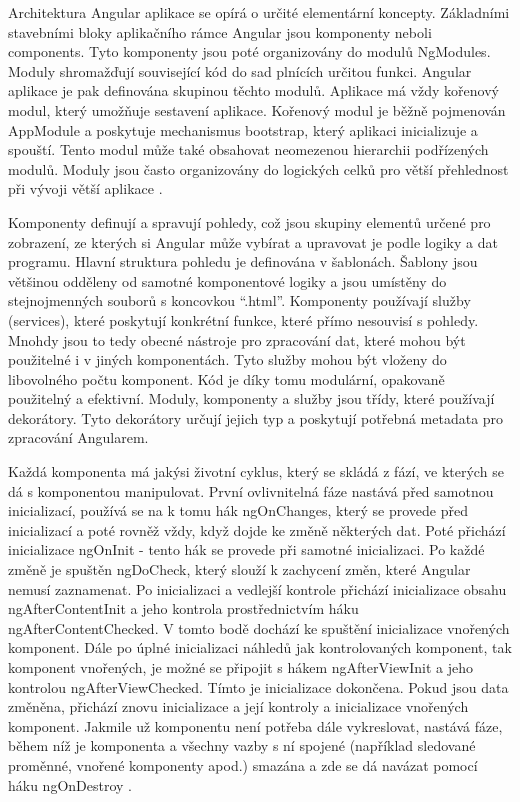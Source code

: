 Architektura Angular aplikace se opírá o určité elementární koncepty. Základními stavebními bloky aplikačního rámce Angular jsou komponenty neboli components. Tyto komponenty jsou poté organizovány do modulů NgModules. Moduly shromažďují související kód do sad plnících určitou funkci. Angular aplikace je pak definována skupinou těchto modulů. Aplikace má vždy kořenový modul, který umožňuje sestavení aplikace. Kořenový modul je běžně pojmenován AppModule a poskytuje mechanismus bootstrap, který aplikaci inicializuje a spouští. Tento modul může také obsahovat neomezenou hierarchii podřízených modulů. Moduly jsou často organizovány do logických celků pro větší přehlednost při vývoji větší aplikace \cite{angularforenterprise}.

Komponenty definují a spravují pohledy, což jsou skupiny elementů určené pro zobrazení, ze kterých si Angular může vybírat a upravovat je podle logiky a dat programu. Hlavní struktura pohledu je definována v šablonách. Šablony jsou většinou odděleny od samotné komponentové logiky a jsou umístěny do stejnojmenných souborů s koncovkou “.html”.
Komponenty používají služby (services), které poskytují konkrétní funkce, které přímo nesouvisí s pohledy. Mnohdy jsou to tedy obecné nástroje pro zpracování dat, které mohou být použitelné i v jiných komponentách. Tyto služby mohou být vloženy do libovolného počtu komponent. Kód je díky tomu modulární, opakovaně použitelný a efektivní. Moduly, komponenty a služby jsou třídy, které používají dekorátory. Tyto dekorátory určují jejich typ a poskytují potřebná metadata pro zpracování Angularem.

Každá komponenta má jakýsi životní cyklus, který se skládá z fází, ve kterých se dá s komponentou manipulovat. První ovlivnitelná fáze nastává před samotnou inicializací, používá se na k tomu hák ngOnChanges, který se provede před inicializací a poté rovněž vždy, když dojde ke změně některých dat. Poté přichází inicializace ngOnInit - tento hák se provede při samotné inicializaci. Po každé změně je spuštěn ngDoCheck, který slouží k zachycení změn, které Angular nemusí zaznamenat. Po inicializaci a vedlejší kontrole přichází inicializace obsahu ngAfterContentInit a jeho kontrola prostřednictvím háku ngAfterContentChecked. V tomto bodě dochází ke spuštění inicializace vnořených komponent. Dále po úplné inicializaci náhledů jak kontrolovaných komponent, tak komponent vnořených, je možné se připojit s hákem ngAfterViewInit a jeho kontrolou ngAfterViewChecked. Tímto je inicializace dokončena. Pokud jsou data změněna, přichází znovu inicializace a její kontroly a inicializace vnořených komponent. Jakmile už komponentu není potřeba dále vykreslovat, nastává fáze, během níž je komponenta a všechny vazby s ní spojené (například sledované proměnné, vnořené komponenty apod.) smazána a zde se dá navázat pomocí háku ngOnDestroy \cite{angularforenterprise}.

